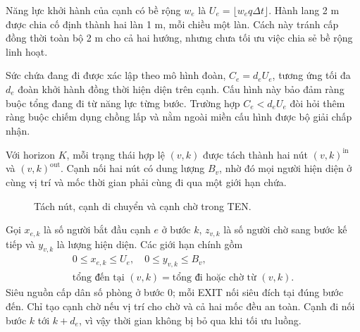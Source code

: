 Năng lực khởi hành của cạnh có bề rộng $w_e$ là $U_e=\lfloor w_eq\Delta t\rfloor$. Hành lang 2 m được chia cố định thành hai làn 1 m, mỗi chiều một làn. Cách này tránh cấp đồng thời toàn bộ 2 m cho cả hai hướng, nhưng chưa tối ưu việc chia sẻ bề rộng linh hoạt.

Sức chứa đang đi được xác lập theo mô hình đoàn, $C_e=d_eU_e$, tương ứng tối đa $d_e$ đoàn khởi hành đồng thời hiện diện trên cạnh. Cấu hình này bảo đảm ràng buộc tổng đang đi từ năng lực từng bước. Trường hợp $C_e<d_eU_e$ đòi hỏi thêm ràng buộc chiếm dụng chồng lấp và nằm ngoài miền cấu hình được bộ giải chấp nhận.

Với horizon $K$, mỗi trạng thái hợp lệ $(v,k)$ được tách thành hai nút $(v,k)^{\mathrm{in}}$ và $(v,k)^{\mathrm{out}}$. Cạnh nối hai nút có dung lượng $B_v$, nhờ đó mọi người hiện diện ở cùng vị trí và mốc thời gian phải cùng đi qua một giới hạn chứa.

\begin{figure}[htbp]\centering
{}
\caption{Tách nút, cạnh di chuyển và cạnh chờ trong TEN.}\end{figure}

Gọi $x_{e,k}$ là số người bắt đầu cạnh $e$ ở bước $k$, $z_{v,k}$ là số người chờ sang bước kế tiếp và $y_{v,k}$ là lượng hiện diện. Các giới hạn chính gồm
\begin{align}0\le x_{e,k}\le U_e,\quad 0\le y_{v,k}\le B_v,\\
\text{tổng đến tại }(v,k)=\text{tổng đi hoặc chờ từ }(v,k).
\end{align}
Siêu nguồn cấp dân số phòng ở bước 0; mỗi EXIT nối siêu đích tại đúng bước đến. Chỉ tạo cạnh chờ nếu vị trí cho chờ và cả hai mốc đều an toàn. Cạnh đi nối bước $k$ tới $k+d_e$, vì vậy thời gian không bị bỏ qua khi tối ưu luồng.

